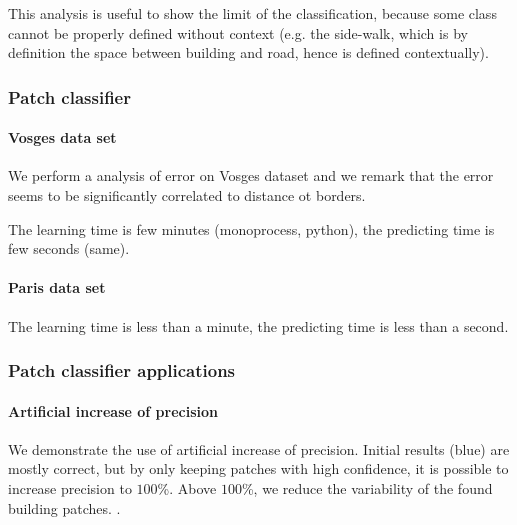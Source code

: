 				
				This analysis is useful to show the limit of the classification, because some class cannot be properly defined without context (e.g. the side-walk, which is by definition the space between building and road, hence is defined contextually).
		
		\subsubsection{Patch classifier}
			\paragraph{Vosges data set}
			 
				We perform a analysis of error on Vosges dataset and we remark that the error seems to be significantly correlated to distance ot borders.
				
				
				The learning time is few minutes (monoprocess, python), the predicting time is few seconds (same).
				
				
			\paragraph{Paris data set}
			
				 
				The learning time is less than a minute, the predicting time is less than a second. 
			
		\subsubsection{Patch classifier applications} 
			
			\paragraph{Artificial increase of precision}
				We demonstrate the use of artificial increase of precision. Initial results (blue) are mostly correct, but by only keeping patches with high confidence, it is possible to increase precision to $100$\%. Above $100$\%, we reduce the variability of the found building patches. 
				.
				
